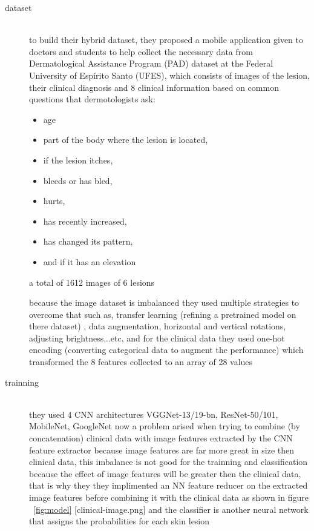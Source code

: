 \begin{description}
\item[dataset] \hfill \\
to build their hybrid dataset, they proposed a mobile application given to doctors and students to help collect the necessary data from Dermatological Assistance Program (PAD) dataset at the Federal University of Espírito Santo (UFES), which consists of images of the lesion, their clinical diagnosis and 8 clinical information based on common questions that dermotologists ask:
\begin{itemize}
    \item age
    \item part of the body where the lesion is located,
    \item if the lesion itches,
    \item bleeds or has bled,
    \item hurts, 
    \item has recently increased, 
    \item has changed its pattern, 
    \item and if it has an elevation
\end{itemize}

a total of 1612 images of 6 lesions

because the image dataset is imbalanced they used multiple strategies to overcome that such as, transfer learning (refining a pretrained model on there dataset) , data augmentation, horizontal and vertical rotations, adjusting brightness...etc, and for the clinical data they used one-hot encoding (converting categorical data to augment the performance) which transformed the 8 features collected to an array of 28 values 

\item[trainning] \hfill \\
    they used 4 CNN architectures VGGNet-13/19-bn, ResNet-50/101, MobileNet, GoogleNet
    now a problem arised when trying to combine (by concatenation) clinical data with image features extracted by the CNN feature extractor because image features are far more great in size then clinical data, this imbalance is not good for the trainning and classification because the effect of image features will be greater then the clinical data, that is why they  they implimented an NN feature reducer on the extracted image features before combining it with the clinical data as shown in figure ~\ref{fig:model} [clinical-image.png] and the classifier is another neural network that assigns the probabilities for each skin lesion


\end{description}
